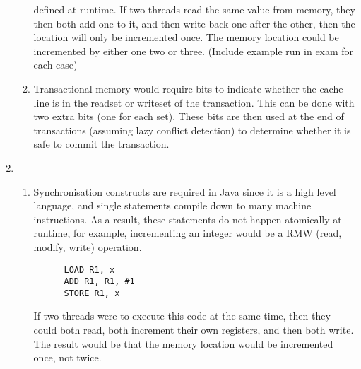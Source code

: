 \documentclass{report}
\begin{document}
\begin{enumerate}
\begin{enumerate}
    defined at runtime. If two threads read the same value from
    memory, they then both add one to it, and then write back one
    after the other, then the location will only be incremented
    once. The memory location could be incremented by either one two
    or three. (Include example run in exam for each case)
  \item Transactional memory would require bits to indicate whether
    the cache line is in the readset or writeset of the
    transaction. This can be done with two extra bits (one for each
    set). These bits are then used at the end of transactions
    (assuming lazy conflict detection) to determine whether it is safe
    to commit the transaction.
  \end{enumerate}
\item
  \begin{enumerate}
  \item Synchronisation constructs are required in Java since it is a
    high level language, and single statements compile down to many
    machine instructions. As a result, these statements do not happen
    atomically at runtime, for example, incrementing an integer would
    be a RMW (read, modify, write) operation.

    \begin{verbatim}
      LOAD R1, x
      ADD R1, R1, #1
      STORE R1, x
    \end{verbatim}

    If two threads were to execute this code at the same time, then
    they could both read, both increment their own registers, and then
    both write. The result would be that the memory location would be
    incremented once, not twice.


\end{enumerate}
\end{enumerate}
\end{document}
